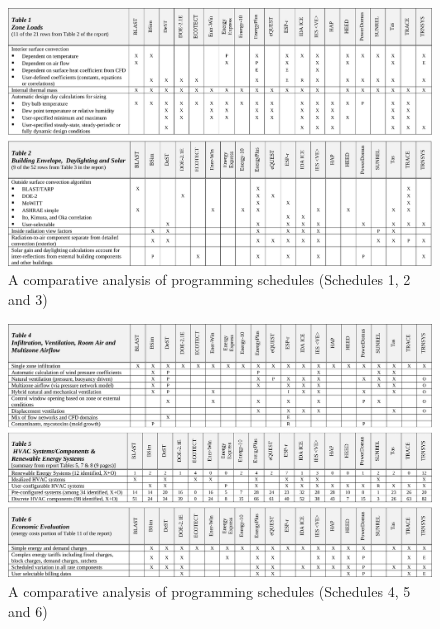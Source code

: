 \begin{figure}
\includegraphics[width=\textwidth]{./Images/9-SimProg1}
\caption[Simulation Programs Comparative Analysis A]{A comparative analysis of programming schedules (Schedules 1, 2 and 3) \cite{crawley05}}
\label{fig:SimProg1}
\end{figure}

\begin{figure}
\includegraphics[width=\textwidth]{./Images/10-SimProg2}
\caption[Simulation Programs Comparative Analysis B]{A comparative analysis of programming schedules (Schedules 4, 5 and 6) \cite{crawley05}}
\label{fig:SimProg2}
\end{figure}
